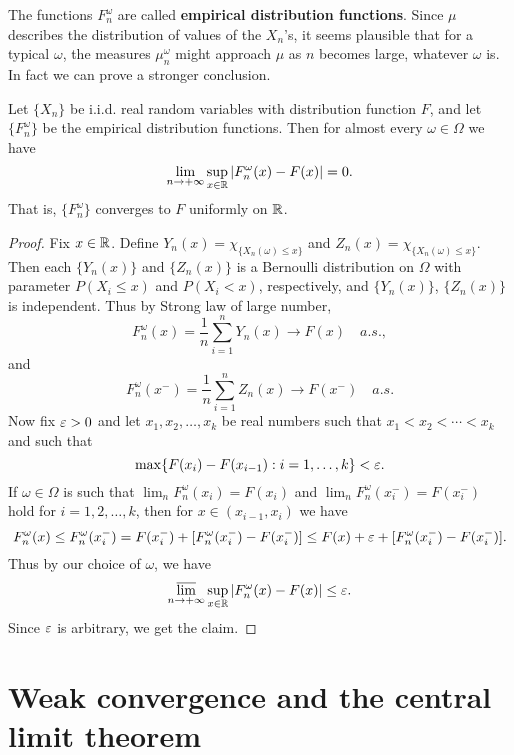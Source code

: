 The functions $F_n^{\omega}$ are called \textbf{empirical distribution functions}. Since $\mu$ describes the distribution of values of the $X_n$'s, it seems plausible that for a typical $\omega$, the measures $\mu_n^\omega$ might approach $\mu$ as $n$ becomes large, whatever $\omega$ is. In fact we can prove a stronger conclusion.
\begin{theorem}
Let $\{X_n\}$ be i.i.d. real random variables with distribution function $F$, and let $\{F_n^\omega\}$ be the empirical distribution functions. Then for almost every $\omega\in\Omega$ we have
\[\lim_{n\to+\infty}\sup_{x\in\mathbb{R}}|F_n^\omega(x)-F(x)|=0.\]
That is, $\{F_n^\omega\}$ converges to $F$ uniformly on $\mathbb{R}$.
\end{theorem}
\begin{proof}
Fix $x\in\mathbb{R}$. Define $Y_n(x)=\chi_{\{X_n(\omega)\leq x\}}$ and $Z_n(x)=\chi_{\{X_n(\omega)\leq x\}}$. Then each $\{Y_n(x)\}$ and $\{Z_n(x)\}$ is a Bernoulli distribution on $\Omega$ with parameter $P(X_i\leq x)$ and $P(X_i<x)$, respectively, and $\{Y_n(x)\}$, $\{Z_n(x)\}$ is independent. Thus by Strong law of large number,
\[F_n^\omega(x)=\frac{1}{n}\sum_{i=1}^{n}Y_n(x)\to F(x)\quad a.s.,\]
and
\[F_n^\omega(x^-)=\frac{1}{n}\sum_{i=1}^{n}Z_n(x)\to F(x^-)\quad a.s.\]
Now fix $\varepsilon>0$ and let $x_1,x_2,\dots,x_k$ be real numbers such that $x_1<x_2<\cdots<x_k$ and such that
\[\max\{F(x_i)-F(x_{i-1}):i=1,\dots,k\}<\varepsilon.\]
If $\omega\in\Omega$ is such that $\lim_nF_n^\omega(x_i)=F(x_i)$ and $\lim_nF_n^\omega(x_i^-)=F(x_i^-)$ hold for $i=1,2,\dots,k$, then for $x\in(x_{i-1},x_i)$ we have
\[F_n^\omega(x)\leq F_n^\omega(x_i^-)=F(x_i^-)+[F_n^\omega(x_i^-)-F(x_i^-)]\leq F(x)+\varepsilon+[F_n^\omega(x_i^-)-F(x_i^-)].\]
Thus by our choice of $\omega$, we have 
\[\varlimsup_{n\to+\infty}\sup_{x\in\mathbb{R}}|F_n^\omega(x)-F(x)|\leq\varepsilon.\]
Since $\varepsilon$ is arbitrary, we get the claim.
\end{proof}
\section{Weak convergence and the central limit theorem}
